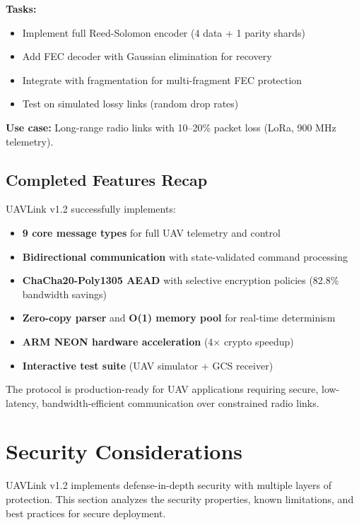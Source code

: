 \documentclass[11pt,a4paper]{article}
\begin{document}
\textbf{Tasks:}
\begin{itemize}[noitemsep]
    \item Implement full Reed-Solomon encoder (4 data + 1 parity shards)
    \item Add FEC decoder with Gaussian elimination for recovery
    \item Integrate with fragmentation for multi-fragment FEC protection
    \item Test on simulated lossy links (random drop rates)
\end{itemize}

\textbf{Use case:} Long-range radio links with 10--20\% packet loss (LoRa, 900 MHz telemetry).

\subsection{Completed Features Recap}

UAVLink v1.2 successfully implements:
\begin{itemize}[noitemsep]
    \item \textbf{9 core message types} for full UAV telemetry and control
    \item \textbf{Bidirectional communication} with state-validated command processing
    \item \textbf{ChaCha20-Poly1305 AEAD} with selective encryption policies (82.8\% bandwidth savings)
    \item \textbf{Zero-copy parser} and \textbf{O(1) memory pool} for real-time determinism
    \item \textbf{ARM NEON hardware acceleration} (4$\times$ crypto speedup)
    \item \textbf{Interactive test suite} (UAV simulator + GCS receiver)
\end{itemize}

The protocol is production-ready for UAV applications requiring secure, low-latency, bandwidth-efficient communication over constrained radio links.

\newpage
\section{Security Considerations}

UAVLink v1.2 implements defense-in-depth security with multiple layers of protection. This section analyzes the security properties, known limitations, and best practices for secure deployment.
\end{document}
